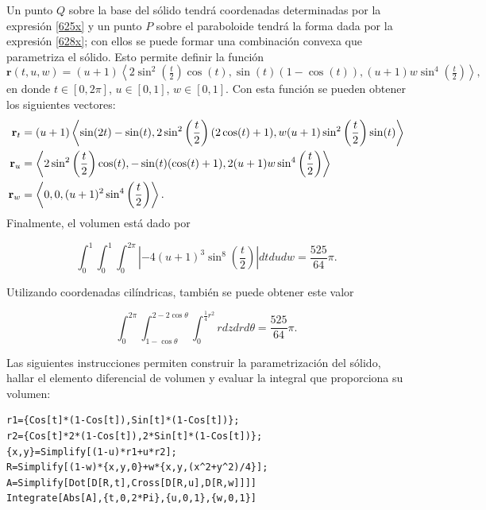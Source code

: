 Un punto $Q$ sobre la base del sólido tendrá coordenadas determinadas por la expresión \ref{625x}
y un punto $P$ sobre el paraboloide tendrá la forma dada por la expresión \ref{628x};
con ellos se puede formar una combinación convexa que parametriza el sólido. Esto permite definir la función
\begin{equation*}
\mathbf{r}(t,u,w) = (u+1)\left\langle 2\sin^2\left(\tfrac{t}{2}\right)\cos(t),\sin(t)(1-\cos(t)),(u+1)w\sin^4\left(\tfrac{t}{2}\right)\right\rangle\!,
\end{equation*}
en donde $t\in [0,2\pi]$, $u \in [0,1]$, $w \in [0,1]$.
Con esta función se pueden obtener los siguientes vectores:
{\footnotesize
\begin{align*}
{\bf r}_{t} &= (u+1)\left \langle\sin(2t)-\sin(t), 2\sin^2\left(\frac{t}{2}\right)(2\cos (t)+1), w(u+1) \sin ^2\left(\frac{t}{2}\right) \sin (t) \right \rangle \\
{\bf r}_{u} &=\left \langle 2 \sin ^2\left(\frac{t}{2}\right) \cos (t), -\sin (t)(\cos (t)+1), 2(u+1) w \sin ^4\left(\frac{t}{2}\right) \right \rangle \\
{\bf r}_{w} &=\left \langle 0,0,(u+1)^2 \sin ^4\left(\frac{t}{2}\right) \right \rangle.
\end{align*}
}
Finalmente, el volumen está dado por

\[\int_{0}^{1}\int_{0}^{1}\int_{0}^{2\pi }\left | -4 (u+1)^3 \sin ^8\left(\frac{t}{2}\right)\right|dtdudw= \frac{525}{64}\pi.\]

Utilizando coordenadas cilíndricas, también se puede obtener este valor

\[\int_{0}^{2\pi}\int_{1-\cos\theta}^{2-2\cos\theta}\int_{0}^{\frac{1}{4}r^{2}}rdzdrd\theta=\frac{525}{64}\pi.\]

Las siguientes instrucciones permiten construir la parametrización del sólido, hallar el elemento diferencial de volumen y evaluar la integral que proporciona su volumen:

\begin{tcolorbox}[title=\bf Instrucción en \verb"Mathematica"]\begin{Verbatim}[formatcom=\letraverbatim]
r1={Cos[t]*(1-Cos[t]),Sin[t]*(1-Cos[t])};
r2={Cos[t]*2*(1-Cos[t]),2*Sin[t]*(1-Cos[t])};
{x,y}=Simplify[(1-u)*r1+u*r2];
R=Simplify[(1-w)*{x,y,0}+w*{x,y,(x^2+y^2)/4}];
A=Simplify[Dot[D[R,t],Cross[D[R,u],D[R,w]]]]
Integrate[Abs[A],{t,0,2*Pi},{u,0,1},{w,0,1}]
\end{Verbatim}
\end{tcolorbox}

